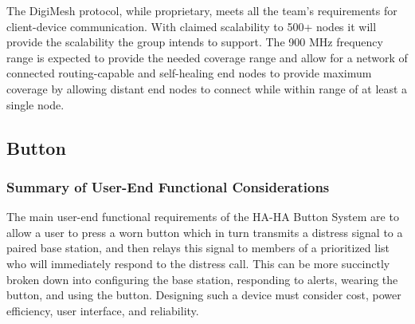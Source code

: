 \documentclass[journal,compsoc]{IEEEtran}
\begin{document}
The DigiMesh protocol, while proprietary, meets all the team's requirements for client-device communication.  With claimed scalability to 500+ nodes it will provide the scalability the group intends to support.  The 900 MHz frequency range is expected to provide the needed coverage range and allow for a network of connected routing-capable and self-healing end nodes to provide maximum coverage  by allowing distant end nodes to connect while within range of at least a single node.

\subsection{Button}

\subsubsection{Summary of User-End Functional Considerations}

The main user-end functional requirements of the HA-HA Button System are to allow a user to press a worn button which in turn transmits a distress signal to a paired base station, and then relays this signal to members of a prioritized list who will immediately respond to the distress call. This can be more succinctly broken down into configuring the base station, responding to alerts, wearing the button, and using the button.  Designing such a device must consider cost, power efficiency, user interface, and reliability.
\end{document}
